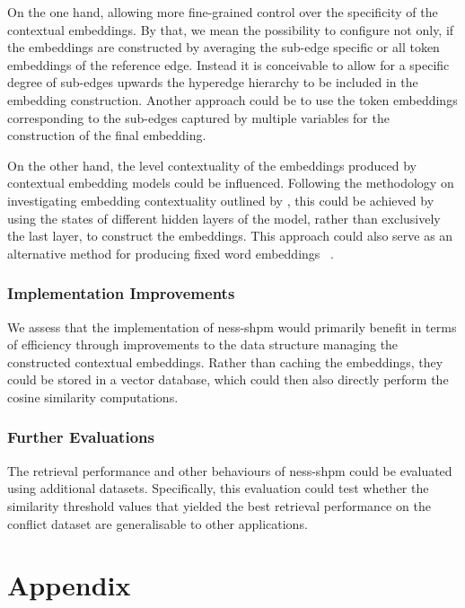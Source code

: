 \documentclass[11pt, numbers=noenddot]{scrreprt}
\let\citef\cite  %
\let\cite\parencite  %
\begin{document}
On the one hand, allowing more fine-grained control over the specificity of the contextual embeddings. By that, we mean the possibility to configure not only, if the embeddings are constructed by averaging the sub-edge specific or all token embeddings of the reference edge. Instead it is conceivable to allow for a specific degree of sub-edges upwards the hyperedge hierarchy to be included in the embedding construction. Another approach could be to use the token embeddings corresponding to the sub-edges captured by multiple variables for the construction of the final embedding.

On the other hand, the level contextuality of the embeddings produced by contextual embedding models could be influenced. Following the methodology on investigating embedding contextuality outlined by \citef{ethayarajhHowContextualAre2019}, this could be achieved by using the states of different hidden layers of the model, rather than exclusively the last layer, to construct the embeddings. This approach could also serve as an alternative method for producing fixed word embeddings \ \cite{guptaObtainingBetterStatic2021}.


\subsection*{Implementation Improvements}
We assess that the implementation of \gls{ness-shpm} would primarily benefit in terms of efficiency through improvements to the data structure managing the constructed contextual embeddings. Rather than caching the embeddings, they could be stored in a vector database, which could then also directly perform the cosine similarity computations.


\subsection*{Further Evaluations}
The retrieval performance and other behaviours of \gls{ness-shpm} could be evaluated using additional datasets. Specifically, this evaluation could test whether the similarity threshold values that yielded the best retrieval performance on the conflict dataset are generalisable to other applications.



\printglossaries
\printbibliography
\appendix
\chapter{Appendix}

\end{document}

